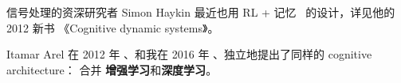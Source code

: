\documentclass[orivec]{llncs}
\newcommand{\emp}[1]{\textbf{\textcolor{Cerulean}{#1}}}
\begin{document}
信号处理的资深研究者 Simon Haykin 最近也用 RL + 记忆~ 的设计，详见他的 2012 新书 《Cognitive dynamic systems》。 

Itamar Arel 在 2012 年 \cite{Arel2012}、和我在 2016 年 \cite{Yan2017}、独立地提出了同样的 cognitive architecture： 合并 \textbf{增强学习}和\textbf{深度学习}。




\end{document}
